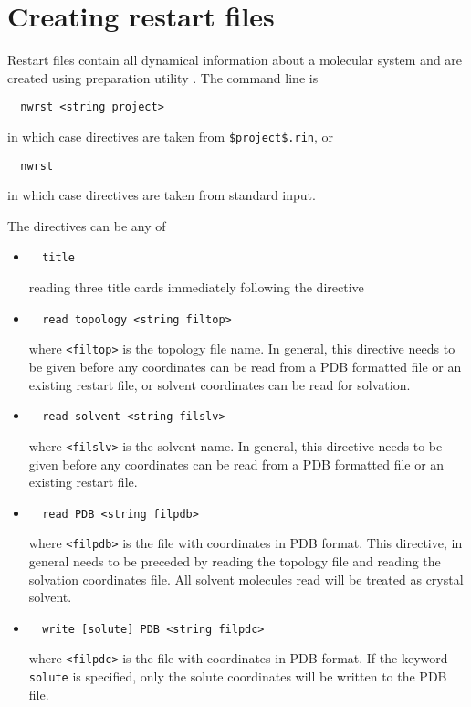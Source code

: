 \section{Creating restart files}
\label{sec:nwanwrst}
Restart files contain all dynamical information about a molecular
system and are created using preparation utility \nwrst. The command
line is
\begin{verbatim}
  nwrst <string project>
\end{verbatim}
in which case directives are taken from \verb+$project$.rin+, or
\begin{verbatim}
  nwrst
\end{verbatim}
in which case directives are taken from standard input.

The directives can be any of
\begin{itemize}

\item
\begin{verbatim}
  title
\end{verbatim}
reading three title cards immediately following the directive

\item
\begin{verbatim}
  read topology <string filtop>
\end{verbatim}
where \verb+<filtop>+ is the topology file name. In general, this
directive needs to be given before any coordinates can be read from a
PDB formatted file or an existing restart file, or solvent coordinates
can be read for solvation.

\item
\begin{verbatim}
  read solvent <string filslv>
\end{verbatim}
where \verb+<filslv>+ is the solvent name. In general, this directive
needs to be given before any coordinates can be read from a PDB
formatted file or an existing restart file.

\item
\begin{verbatim}
  read PDB <string filpdb>
\end{verbatim}
where \verb+<filpdb>+ is the file with coordinates in PDB format. This
directive, in general needs to be preceded by reading the topology
file and reading the solvation coordinates file. All solvent molecules
read will be treated as crystal solvent.

\item
\begin{verbatim}
  write [solute] PDB <string filpdc>
\end{verbatim}
where \verb+<filpdc>+ is the file with coordinates in PDB format. If
the keyword \verb+solute+ is specified, only the solute coordinates
will be written to the PDB file.


\end{itemize}

